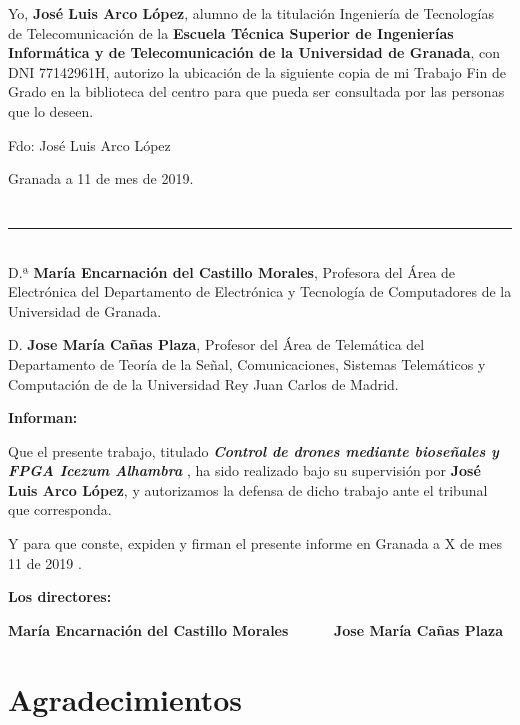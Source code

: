 Yo, \textbf{José Luis Arco López}, alumno de la titulación Ingeniería de Tecnologías de Telecomunicación de la \textbf{Escuela Técnica Superior
de Ingenierías Informática y de Telecomunicación de la Universidad de Granada}, con DNI 77142961H, autorizo la
ubicación de la siguiente copia de mi Trabajo Fin de Grado en la biblioteca del centro para que pueda ser
consultada por las personas que lo deseen.

\vspace{6cm}

\noindent Fdo: José Luis Arco López

\vspace{2cm}

\begin{flushright}
Granada a 11 de mes de 2019.
\end{flushright}


\chapter*{}
\thispagestyle{empty}

\noindent\rule[-1ex]{\textwidth}{2pt}\\[4.5ex]

D.ª \textbf{ María Encarnación del Castillo Morales}, Profesora del Área de Electrónica del Departamento de Electrónica y Tecnología de Computadores de la Universidad de Granada.

\vspace{0.5cm}

D. \textbf{Jose María Cañas Plaza}, Profesor del Área de Telemática del Departamento de Teoría de la Señal, Comunicaciones, Sistemas Telemáticos y Computación de  de la Universidad Rey Juan Carlos de Madrid.


\vspace{0.5cm}

\textbf{Informan:}

\vspace{0.5cm}

Que el presente trabajo, titulado \textit{\textbf{Control de drones mediante bioseñales y FPGA Icezum Alhambra }},
ha sido realizado bajo su supervisión por \textbf{José Luis Arco López}, y autorizamos la defensa de dicho trabajo ante el tribunal
que corresponda.

\vspace{0.5cm}

Y para que conste, expiden y firman el presente informe en Granada a X de mes 11 de 2019 .

\vspace{1cm}

\textbf{Los directores:}

\vspace{5cm}

\noindent \textbf{María Encarnación del Castillo Morales \ \ \ \ \ Jose María Cañas Plaza}

\chapter*{Agradecimientos}
\thispagestyle{empty}

       \vspace{1cm}




